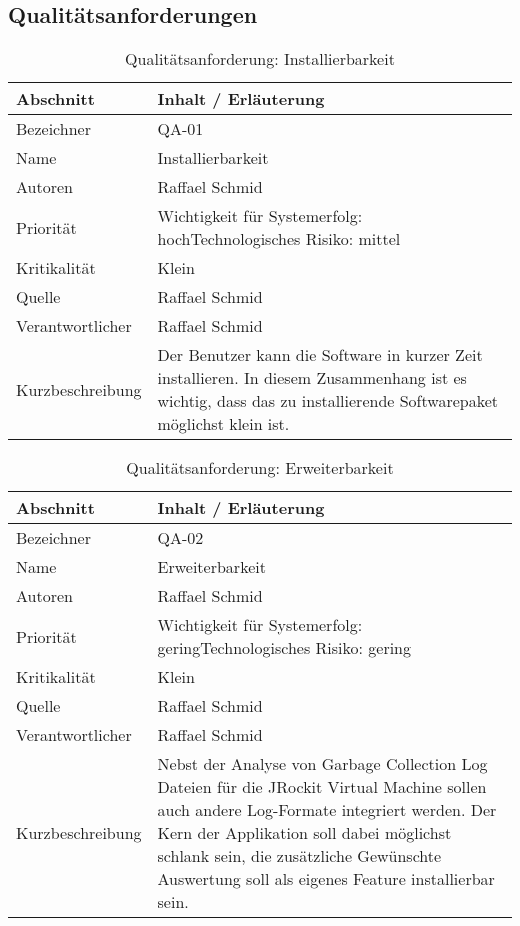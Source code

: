 \subsection{Qualitätsanforderungen}
\begin{longtable}{|p{4cm}|p{10.5cm}|}
    \caption{Qualitätsanforderung: Installierbarkeit}\\\hline
   \textbf{Abschnitt} & \textbf{Inhalt / Erläuterung} \\\hline
   Bezeichner & QA-01\\\hline
   Name & Installierbarkeit\\\hline
   Autoren & Raffael Schmid\\\hline
   Priorität & Wichtigkeit für Systemerfolg: hoch\newline Technologisches Risiko: mittel\\\hline
   Kritikalität & Klein\\\hline
   Quelle & Raffael Schmid\\\hline
   Verantwortlicher & Raffael Schmid\\\hline
   Kurzbeschreibung & Der Benutzer kann die Software in kurzer Zeit installieren. In diesem Zusammenhang ist es wichtig, dass das zu installierende Softwarepaket möglichst klein ist.\\\hline
\end{longtable}

\begin{longtable}{|p{4cm}|p{10.5cm}|}
    \caption{Qualitätsanforderung: Erweiterbarkeit}\\\hline
   \textbf{Abschnitt} & \textbf{Inhalt / Erläuterung} \\\hline
   Bezeichner & QA-02\\\hline
   Name & Erweiterbarkeit\\\hline
   Autoren & Raffael Schmid\\\hline
   Priorität & Wichtigkeit für Systemerfolg: gering\newline Technologisches Risiko: gering\\\hline
   Kritikalität & Klein\\\hline
   Quelle & Raffael Schmid\\\hline
   Verantwortlicher & Raffael Schmid\\\hline
   Kurzbeschreibung & Nebst der Analyse von Garbage Collection Log Dateien für die JRockit Virtual Machine sollen auch andere Log-Formate integriert werden. Der Kern der Applikation soll dabei möglichst schlank sein, die zusätzliche Gewünschte Auswertung soll als eigenes Feature installierbar sein.\\\hline
\end{longtable}

